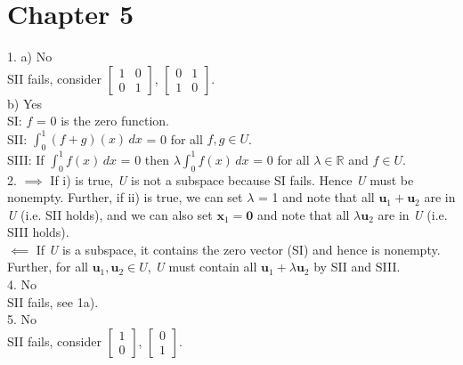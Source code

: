 \documentclass{article}
\begin{document}
    \section*{Chapter 5}
    \setlength{\parindent}{0pt}
    1. a) No\\
    SII fails, consider $\begin{bmatrix} 1 & 0 \\ 0 & 1\end{bmatrix}$, $\begin{bmatrix} 0 & 1 \\ 1 & 0\end{bmatrix}$.\\
    b) Yes\\
    SI: $f$ = 0 is the zero function.\\
    SII: \(\int_{0}^{1} (f + g)(x)\,dx\) = 0 for all $f, g \in \textit{U}$.\\
    SIII: If \(\int_{0}^{1} f(x) \,dx\) = 0 then $\lambda$\(\int_{0}^{1} f(x) \,dx\) = 0 for all $\lambda \in \mathbb{R}$ and $f \in \textit{U}$.\\

    2. $\implies$ If i) is true, \textit{U} is not a subspace because SI fails. Hence \textit{U} must be nonempty. Further, if ii) is true, we can set $\lambda$ = 1 and note that all $\textbf{u}_1 + \textbf{u}_2$ are in \textit{U} (i.e. SII holds), and we can also set $\textbf{x}_1 = \textbf{0}$ and note that all $\lambda\textbf{u}_2$ are in \textit{U} (i.e. SIII holds).\\
  $\impliedby$ If \textit{U} is a subspace, it contains the zero vector (SI) and hence is nonempty. Further, for all $\textbf{u}_1, \textbf{u}_2 \in \textit{U}$, \textit{U} must contain all $\textbf{u}_1 + \lambda\textbf{u}_2$ by SII and SIII.\\

    4. No \\
    SII fails, see 1a).\\

    5. No \\
    SII fails, consider $\begin{bmatrix} 1 \\ 0\end{bmatrix}$, $\begin{bmatrix} 0 \\ 1\end{bmatrix}$.\\
\end{document}
